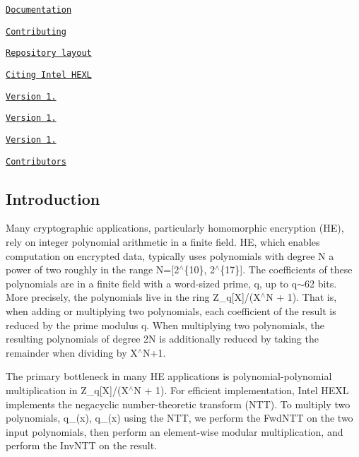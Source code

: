 \begin{DoxyItemize}
\item \href{#documentation}{\tt Documentation}
\item \href{#contributing}{\tt Contributing}
\begin{DoxyItemize}
\item \href{#repository-layout}{\tt Repository layout}
\end{DoxyItemize}
\item \href{#citing-intel-hexl}{\tt Citing Intel H\+E\+XL}
\begin{DoxyItemize}
\item \href{#version-12}{\tt Version 1.}
\item \href{#version-11}{\tt Version 1.}
\item \href{#version-10}{\tt Version 1.}
\end{DoxyItemize}
\item \href{#contributors}{\tt Contributors}
\end{DoxyItemize}

\subsection*{Introduction}

Many cryptographic applications, particularly homomorphic encryption (HE), rely on integer polynomial arithmetic in a finite field. HE, which enables computation on encrypted data, typically uses polynomials with degree {\ttfamily N} a power of two roughly in the range {\ttfamily N=\mbox{[}2$^\wedge$\{10\}, 2$^\wedge$\{17\}\mbox{]}}. The coefficients of these polynomials are in a finite field with a word-\/sized prime, {\ttfamily q}, up to {\ttfamily q}$\sim$62 bits. More precisely, the polynomials live in the ring {\ttfamily Z\+\_\+q\mbox{[}X\mbox{]}/(X$^\wedge$N + 1)}. That is, when adding or multiplying two polynomials, each coefficient of the result is reduced by the prime modulus {\ttfamily q}. When multiplying two polynomials, the resulting polynomials of degree {\ttfamily 2N} is additionally reduced by taking the remainder when dividing by {\ttfamily X$^\wedge$\+N+1}.

The primary bottleneck in many HE applications is polynomial-\/polynomial multiplication in {\ttfamily Z\+\_\+q\mbox{[}X\mbox{]}/(X$^\wedge$N + 1)}. For efficient implementation, Intel H\+E\+XL implements the negacyclic number-\/theoretic transform (N\+TT). To multiply two polynomials, {\ttfamily q\+\_(x), q\+\_(x)} using the N\+TT, we perform the Fwd\+N\+TT on the two input polynomials, then perform an element-\/wise modular multiplication, and perform the Inv\+N\+TT on the result.


